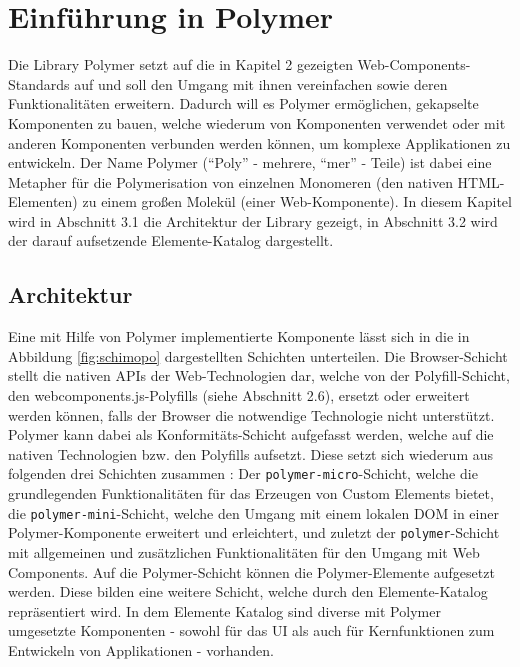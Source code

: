 \chapter{Einführung in Polymer}\label{einfuxfchrung-in-polymer}

Die Library Polymer setzt auf die in Kapitel 2 gezeigten Web-Components-Standards auf und soll den Umgang mit ihnen vereinfachen sowie deren Funktionalitäten erweitern. Dadurch will es Polymer ermöglichen, gekapselte Komponenten zu bauen, welche wiederum von Komponenten verwendet oder mit anderen Komponenten verbunden werden können, um komplexe Applikationen zu entwickeln. Der Name Polymer (``Poly'' - mehrere, ``mer'' - Teile) ist dabei eine Metapher für die Polymerisation von einzelnen Monomeren (den nativen HTML-Elementen) zu einem großen Molekül (einer Web-Komponente). In diesem Kapitel wird in Abschnitt 3.1 die Architektur der Library gezeigt, in Abschnitt 3.2 wird der darauf aufsetzende Elemente-Katalog dargestellt.


\section{Architektur}\label{architektur}

Eine mit Hilfe von Polymer implementierte Komponente lässt sich in die in Abbildung \ref{fig:schimopo} dargestellten Schichten unterteilen. Die Browser-Schicht stellt die nativen APIs der Web-Technologien dar, welche von der Polyfill-Schicht, den webcomponents.js-Polyfills (siehe Abschnitt 2.6), ersetzt oder erweitert werden können, falls der Browser die notwendige Technologie nicht unterstützt. Polymer kann dabei als Konformitäts-Schicht aufgefasst werden, welche auf die nativen Technologien bzw. den Polyfills aufsetzt. Diese setzt sich wiederum aus folgenden drei Schichten zusammen \cite{citeulike:13915080}: Der \texttt{polymer-micro}-Schicht, welche die grundlegenden Funktionalitäten für das Erzeugen von Custom Elements bietet, die \texttt{polymer-mini}-Schicht, welche den Umgang mit einem lokalen DOM in einer Polymer-Komponente erweitert und erleichtert, und zuletzt der \texttt{polymer}-Schicht mit allgemeinen und zusätzlichen Funktionalitäten für den Umgang mit Web Components. Auf die Polymer-Schicht können die Polymer-Elemente aufgesetzt werden. Diese bilden eine weitere Schicht, welche durch den Elemente-Katalog \cite{citeulike:13916374} repräsentiert wird. In dem Elemente Katalog sind diverse mit Polymer umgesetzte Komponenten - sowohl für das UI als auch für Kernfunktionen zum Entwickeln von Applikationen - vorhanden.

